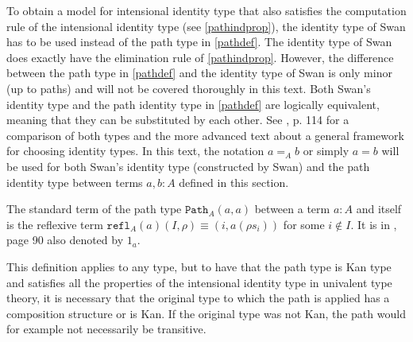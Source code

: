 \documentclass[12pt,a4paper,twoside,xetex]{book}
\newcommand{\op}[1]{\mathtt{#1}}
\begin{document}
To obtain a model for intensional identity type that also satisfies the 
computation rule of the intensional identity type (see \cref{pathindprop}), the 
identity type of Swan \cite{Swan2014} has to be used instead of the path type 
in \cref{pathdef}. The identity type of Swan does exactly have the elimination 
rule of \cref{pathindprop}. However, the difference between the path type in 
\cref{pathdef} and the identity type of Swan is only minor (up to paths) and 
will not be covered thoroughly in this text. Both Swan's identity type and the 
path identity type in \cref{pathdef} are logically equivalent, meaning that 
they can be substituted by each other. See  \cite{Huber2016}, p. 114 for a 
comparison of both types and the more advanced text \cite{Swa18} about a 
general framework for choosing identity types. In this text, the notation $a 
=_A b$ or simply $a = b$ will be used for both Swan's identity type 
(constructed by Swan) and the path identity type between terms $a, b: A$ defined 
in this section. 

The standard term of the path type $\op{Path}_A(a,a)$ between a term $a : A$ 
and itself  is the reflexive term $\op{refl}_A(a)(I,\rho) \equiv (i, a(\rho 
s_i))$ for some $i \not \in I$. It is in \cite{Huber2016}, page 90 also denoted 
by $1_a$.

This definition applies to any type, but to have that the path type is Kan type 
and satisfies all the properties of the intensional identity type in univalent 
type theory, it is necessary that the original type to which the path is 
applied has a composition structure or is Kan. If the original type was not 
Kan, the path would for example not necessarily be transitive. 
\end{document}
